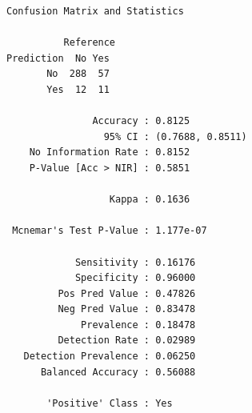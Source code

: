 \documentclass[
  letterpaper,
  DIV=11,
  numbers=noendperiod]{scrreprt}
\newenvironment{Shaded}{\begin{snugshade}}{\end{snugshade}}
\newcommand{\AttributeTok}[1]{\textcolor[rgb]{0.40,0.45,0.13}{#1}}
\newcommand{\FunctionTok}[1]{\textcolor[rgb]{0.28,0.35,0.67}{#1}}
\newcommand{\NormalTok}[1]{\textcolor[rgb]{0.00,0.23,0.31}{#1}}
\newcommand{\SpecialCharTok}[1]{\textcolor[rgb]{0.37,0.37,0.37}{#1}}
\newcommand{\StringTok}[1]{\textcolor[rgb]{0.13,0.47,0.30}{#1}}
\begin{document}
\begin{verbatim}
Confusion Matrix and Statistics

          Reference
Prediction  No Yes
       No  288  57
       Yes  12  11
                                          
               Accuracy : 0.8125          
                 95% CI : (0.7688, 0.8511)
    No Information Rate : 0.8152          
    P-Value [Acc > NIR] : 0.5851          
                                          
                  Kappa : 0.1636          
                                          
 Mcnemar's Test P-Value : 1.177e-07       
                                          
            Sensitivity : 0.16176         
            Specificity : 0.96000         
         Pos Pred Value : 0.47826         
         Neg Pred Value : 0.83478         
             Prevalence : 0.18478         
         Detection Rate : 0.02989         
   Detection Prevalence : 0.06250         
      Balanced Accuracy : 0.56088         
                                          
       'Positive' Class : Yes             
                                          
\end{verbatim}

\begin{Shaded}
\end{Shaded}
\end{document}
